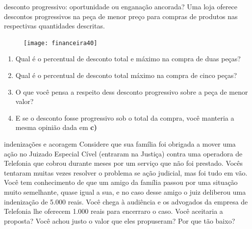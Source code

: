\begin{task}{desconto progressivo: oportunidade ou enganação ancorada?}
Uma loja oferece descontos progressivos na peça de menor preço para compras de produtos nas respectivas quantidades descritas.

\begin{figure}[H]
\centering

\texttt{[image: financeira40]}
\end{figure}

\begin{enumerate}
\item Qual é o percentual de desconto total e máximo na compra de duas peças?
\item Qual é o percentual de desconto total máximo na compra de cinco peças?
\item O que você pensa a respeito dess desconto progressivo sobre a peça de menor valor?
\item E se o desconto fosse progressivo sob o total da compra, você manteria a mesma opinião dada em \textcolor{\currentcolor}{\textbf{c)}}
\end{enumerate}
\end{task}





\begin{task}{indenizações e acoragem}
Considere que sua família foi obrigada a mover uma ação no Juizado Especial Cível (entraram na Justiça) contra uma operadora de Telefonia que cobrou durante meses por um serviço que não foi prestado. Vocês tentaram muitas vezes resolver o problema se ação judicial, mas foi tudo em vão. Você tem conhecimento de que um amigo da família passou por uma situação muito semelhante, quase igual a sua, e no caso desse amigo o juiz deliberou uma indenização de 5.000 reais. Você chega à audiência e os advogados da empresa de Telefonia lhe oferecem 1.000 reais para encerraro o caso. Você aceitaria a proposta? Você achou justo o valor que eles propuseram? Por que tão baixo?
\end{task}

\clearpage

